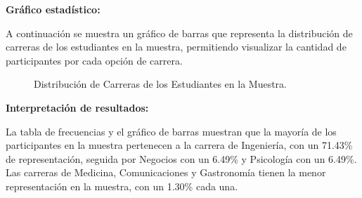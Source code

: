 \newpage

\textbf{Gráfico estadístico:}

A continuación se muestra un gráfico de barras que representa la distribución de carreras de los estudiantes en la muestra, permitiendo visualizar la cantidad de participantes por cada opción de carrera.

\begin{figure}[H]
  \centering
  \caption{Distribución de Carreras de los Estudiantes en la Muestra.}
  \label{fig:carreras-frecuencias}
\end{figure}

\textbf{Interpretación de resultados:}

La tabla de frecuencias y el gráfico de barras muestran que la mayoría de los participantes en la muestra pertenecen a la carrera de Ingeniería, con un 71.43\% de representación, seguida por Negocios con un 6.49\% y Psicología con un 6.49\%. Las carreras de Medicina, Comunicaciones y Gastronomía tienen la menor representación en la muestra, con un 1.30\% cada una.